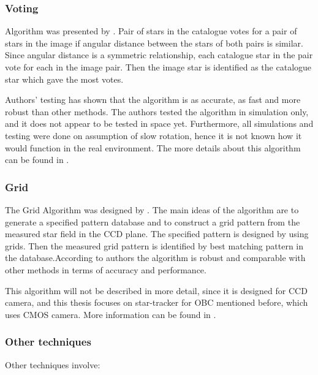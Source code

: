 \documentclass[12pt,a4paper,oneside]{article}
\begin{document}
\subsubsection{Voting}
Algorithm was presented by \citet{kolomenkin2008geometric}. Pair of stars in the catalogue votes for a pair of stars in the image if angular distance between the stars of both pairs is similar. Since angular distance is a symmetric relationship, each catalogue star in the pair vote for each in the image pair. Then the image star is identified as the catalogue star which gave the most votes.

Authors' testing has shown that the algorithm is as accurate, as fast and more robust than other methods. The authors tested the algorithm in simulation only, and it does not appear to be tested in space yet. Furthermore, all simulations and testing were done on assumption of slow rotation, hence it is not known how it would function in the real environment. The more details about this algorithm can be found in \citet{kolomenkin2008geometric}.


\subsubsection{Grid}
The Grid Algorithm was designed by \citet{padgett1997grid}. The main ideas of the algorithm are to generate a specified pattern database and to construct a grid pattern from the measured star field in the CCD plane. The specified pattern is designed by using grids. Then the measured grid pattern is identified by best matching pattern in the database.According to authors the algorithm is robust and comparable with other methods in terms of accuracy and performance. 

This algorithm will not be described in more detail, since it is designed for CCD camera, and this thesis focuses on star-tracker for OBC mentioned before, which uses CMOS camera. More information can be found in \citet{padgett1997grid}.


\subsubsection{Other techniques}

Other techniques involve: 
\end{document}
